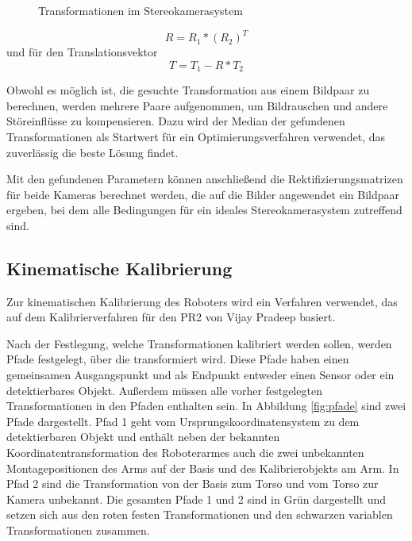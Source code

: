 \begin{figure}[htpb] \centering \def\svgwidth{\textwidth}
   \caption{Transformationen im
  Stereokamerasystem} \label{fig:StereoTrans} \end{figure}


\begin{equation} R=R_1*(R_2)^T \end{equation} und für den Translationsvektor
\begin{equation} T=T_1-R*T_2 \end{equation}

Obwohl es möglich ist, die gesuchte Transformation aus einem Bildpaar zu
berechnen, werden mehrere Paare aufgenommen, um Bildrauschen und andere
Störeinflüsse zu kompensieren. Dazu wird der Median der gefundenen
Transformationen als Startwert für ein Optimierungsverfahren verwendet, das
zuverlässig die beste Lösung findet.

Mit den gefundenen Parametern können anschließend die Rektifizierungsmatrizen
für beide Kameras berechnet werden, die auf die Bilder angewendet ein Bildpaar
ergeben, bei dem alle Bedingungen für ein ideales Stereokamerasystem zutreffend
sind.\cite{Bradski2008}


\subsection{Kinematische Kalibrierung} %

\label{sub:Kinematische Kalibrierung}

Zur kinematischen Kalibrierung des Roboters wird ein Verfahren
verwendet, das auf dem Kalibrierverfahren für den PR2 von Vijay Pradeep basiert.\cite{Pradeep2010}

Nach der Festlegung, welche Transformationen kalibriert werden sollen, werden
Pfade festgelegt, über die transformiert wird. Diese Pfade haben einen
gemeinsamen Ausgangspunkt und als Endpunkt entweder einen Sensor oder ein
detektierbares Objekt. Außerdem müssen alle vorher festgelegten
Transformationen in den Pfaden enthalten sein. In Abbildung \ref{fig:pfade}
sind zwei Pfade dargestellt. Pfad 1 geht vom Ursprungskoordinatensystem zu dem
detektierbaren Objekt und enthält neben der bekannten Koordinatentransformation
des Roboterarmes auch die zwei unbekannten Montagepositionen des Arms auf der
Basis und des Kalibrierobjekts am Arm. In Pfad 2 sind die Transformation von
der Basis zum Torso und vom Torso zur Kamera unbekannt. Die gesamten Pfade 1 und
2 sind in Grün dargestellt und setzen sich aus den roten festen Transformationen
und den schwarzen variablen Transformationen zusammen.

